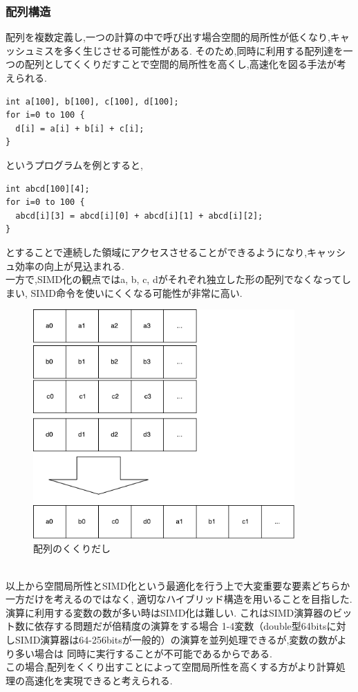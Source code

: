 \subsubsection{配列構造}
配列を複数定義し,一つの計算の中で呼び出す場合空間的局所性が低くなり,キャッシュミスを多く生じさせる可能性がある.
そのため,同時に利用する配列達を一つの配列としてくくりだすことで空間的局所性を高くし,高速化を図る手法が考えられる.\\
{\footnotesize
\begin{lstlisting}[numbers=none,frame=single]
int a[100], b[100], c[100], d[100];
for i=0 to 100 {
  d[i] = a[i] + b[i] + c[i];
}
\end{lstlisting}
}
というプログラムを例とすると,
{\footnotesize
\begin{lstlisting}[numbers=none,frame=single]
int abcd[100][4];
for i=0 to 100 {
  abcd[i][3] = abcd[i][0] + abcd[i][1] + abcd[i][2];
}
\end{lstlisting}
}
とすることで連続した領域にアクセスさせることができるようになり,キャッシュ効率の向上が見込まれる.\\
一方で,SIMD化の観点ではa, b, c, dがそれぞれ独立した形の配列でなくなってしまい,
SIMD命令を使いにくくなる可能性が非常に高い.\\

\begin{figure}[htb]
  \begin{center}
    \includegraphics[width=10cm]{./images/MERGE-ARRAY.pdf}
    \caption{配列のくくりだし}
    \label{fig:merge-array}
  \end{center}
\end{figure}~\\
以上から空間局所性とSIMD化という最適化を行う上で大変重要な要素どちらか一方だけを考えるのではなく,
適切なハイブリッド構造を用いることを目指した.\\
演算に利用する変数の数が多い時はSIMD化は難しい. これはSIMD演算器のビット数に依存する問題だが倍精度の演算をする場合
1-4変数（double型64bitsに対しSIMD演算器は64-256bitsが一般的）の演算を並列処理できるが,変数の数がより多い場合は
同時に実行することが不可能であるからである.\\
この場合,配列をくくり出すことによって空間局所性を高くする方がより計算処理の高速化を実現できると考えられる.\\

